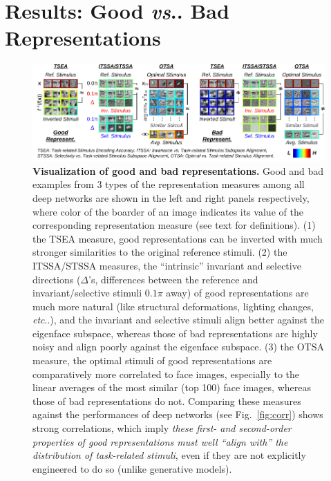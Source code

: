 \documentclass[fleqn]{article} %
\makeatletter
\DeclareRobustCommand\onedot{\futurelet\@let@token\@onedot}
\def\@onedot{\ifx\@let@token.\else.\null\fi\xspace}
\def\eg{\emph{e.g}\onedot} \def\Eg{\emph{E.g}\onedot}
\def\etc{\emph{etc}\onedot} \def\vs{\emph{vs}\onedot}
\makeatother
\begin{document}

\section{Results: Good \vs Bad Representations}
\label{sec:results2}

\begin{figure}[t]
\centering \includegraphics[width=\textwidth, trim=1.0ex 0.5ex 0 0, clip]{Figs/g_vs_b_repr.pdf} 
\caption{{\bf Visualization of good and bad representations.}
Good and bad examples from 3 types of the representation measures among all deep networks are shown in the left and right panels respectively, where color of the boarder of an image indicates its value of the corresponding representation measure (see text for definitions). %
(1) \Wrt the TSEA measure, good representations can be inverted with much stronger similarities to the original reference stimuli.
(2) \Wrt the ITSSA/STSSA measures, the ``intrinsic'' invariant and selective directions ($\Delta$'s, differences between the reference and invariant/selective stimuli $0.1\pi$ away) of good representations are much more natural (like structural deformations, lighting changes, \etc), and the invariant and selective stimuli align better against the eigenface subspace, whereas those of bad representations are highly noisy and align poorly against the eigenface subspace.
(3) \Wrt the OTSA measure, the optimal stimuli of good representations are comparatively more correlated to face images, especially to the linear averages of the most similar (top 100) face images, whereas those of bad representations do not.
Comparing these measures against the performances of deep networks (see Fig.~\ref{fig:corr}) shows strong correlations, which imply \emph{these first- and second-order properties of good representations must well ``align with'' the distribution of task-related stimuli}, even if they are not explicitly engineered to do so (unlike generative models).
}
\label{fig:allrep2}
\end{figure}
\end{document}
